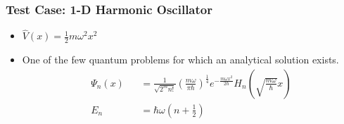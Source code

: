\documentclass[]{beamer}
\begin{document}
\begin{frame}
  \frametitle{Test Case: 1-D Harmonic Oscillator}  

  \begin{itemize}
  \item<1-> $\hat{V}(x)=\frac{1}{2}m\omega^2x^2$
  \item<2-> One of the few quantum problems for which an analytical solution exists.
  \begin{eqnarray*}
  \Psi_n(x) &&= \frac{1}{\sqrt{2^m n!}} \left( \frac{m \omega}{\pi \hbar} \right)^{\frac{1}{4}} e^{ -\frac{m\omega x^2}{2\hbar} }H_n \left( \sqrt{\frac{m \omega}{\hbar}}x \right)\\
  E_n &&= \hbar \omega (n+\frac{1}{2})
  \end{eqnarray*}
  \end{itemize}
  
\end{frame}
\end{document}
